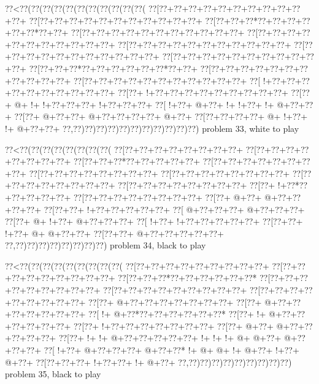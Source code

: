 \vbox{\vbox{\goo
\0??<\0??(\0??(\0??(\0??(\0??(\0??(\0??(\0??(\0??(\0??(\0??(
\0??[\0??+\0??+\0??+\0??+\0??+\0??+\0??+\0??+\0??+\0??+\0??+
\0??[\0??+\0??+\0??+\0??+\0??+\0??+\0??+\0??+\0??+\0??+\0??+
\0??[\0??+\0??+\0??*\0??+\0??+\0??+\0??+\0??+\0??*\0??+\0??+
\0??[\0??+\0??+\0??+\0??+\0??+\0??+\0??+\0??+\0??+\0??+\0??+
\0??[\0??+\0??+\0??+\0??+\0??+\0??+\0??+\0??+\0??+\0??+\0??+
\0??[\0??+\0??+\0??+\0??+\0??+\0??+\0??+\0??+\0??+\0??+\0??+
\0??[\0??+\0??+\0??+\0??+\0??+\0??+\0??+\0??+\0??+\0??+\0??+
\0??[\0??+\0??+\0??+\0??+\0??+\0??+\0??+\0??+\0??+\0??+\0??+
\0??[\0??+\0??+\0??*\0??+\0??+\0??+\0??+\0??+\0??*\0??+\0??+
\0??[\0??+\0??+\0??+\0??+\0??+\0??+\0??+\0??+\0??+\0??+\0??+
\0??[\0??+\0??+\0??+\0??+\0??+\0??+\0??+\0??+\0??+\0??+\0??+
\0??[\- !+\0??+\0??+\0??+\0??+\0??+\0??+\0??+\0??+\0??+\0??+
\0??[\0??+\- !+\0??+\0??+\0??+\0??+\0??+\0??+\0??+\0??+\0??+
\0??[\0??+\- @+\- !+\- !+\0??+\0??+\0??+\- !+\0??+\0??+\0??+
\0??[\- !+\0??+\- @+\0??+\- !+\- !+\0??+\- !+\- @+\0??+\0??+
\0??[\0??+\- @+\0??+\0??+\- @+\0??+\0??+\0??+\0??+\- @+\0??+
\0??[\0??+\0??+\0??+\0??+\- @+\- !+\0??+\- !+\- @+\0??+\0??+
\0??,\0??)\0??)\0??)\0??)\0??)\0??)\0??)\0??)\0??)\0??)\0??)
}
\hfil problem 33, white to play\hfil\break
}

\vbox{\vbox{\goo
\0??<\0??(\0??(\0??(\0??(\0??(\0??(\0??(\0??(
\0??[\0??+\0??+\0??+\0??+\0??+\0??+\0??+\0??+
\0??[\0??+\0??+\0??+\0??+\0??+\0??+\0??+\0??+
\0??[\0??+\0??+\0??*\0??+\0??+\0??+\0??+\0??+
\0??[\0??+\0??+\0??+\0??+\0??+\0??+\0??+\0??+
\0??[\0??+\0??+\0??+\0??+\0??+\0??+\0??+\0??+
\0??[\0??+\0??+\0??+\0??+\0??+\0??+\0??+\0??+
\0??[\0??+\0??+\0??+\0??+\0??+\0??+\0??+\0??+
\0??[\0??+\0??+\0??+\0??+\0??+\0??+\0??+\0??+
\0??[\0??+\- !+\0??*\0??+\0??+\0??+\0??+\0??+
\0??[\0??+\0??+\0??+\0??+\0??+\0??+\0??+\0??+
\0??[\0??+\- @+\0??+\- @+\0??+\0??+\0??+\0??+
\0??[\0??+\0??+\- !+\0??+\0??+\0??+\0??+\0??+
\0??[\- @+\0??+\0??+\0??+\- @+\0??+\0??+\0??+
\0??[\0??+\- @+\- !+\0??+\- @+\0??+\0??+\0??+
\0??[\- !+\0??+\- !+\0??+\0??+\0??+\0??+\0??+
\0??[\0??+\0??+\- !+\0??+\- @+\- @+\0??+\0??+
\0??[\0??+\0??+\- @+\0??+\0??+\0??+\0??+\0??+
\0??,\0??)\0??)\0??)\0??)\0??)\0??)\0??)\0??)
}
\hfil problem 34, black to play\hfil\break
}

\vbox{\vbox{\goo
\0??<\0??(\0??(\0??(\0??(\0??(\0??(\0??(\0??(\0??(
\0??[\0??+\0??+\0??+\0??+\0??+\0??+\0??+\0??+\0??+
\0??[\0??+\0??+\0??+\0??+\0??+\0??+\0??+\0??+\0??+
\0??[\0??+\0??+\0??*\0??+\0??+\0??+\0??+\0??+\0??*
\0??[\0??+\0??+\0??+\0??+\0??+\0??+\0??+\0??+\0??+
\0??[\0??+\0??+\0??+\0??+\0??+\0??+\0??+\0??+\0??+
\0??[\0??+\0??+\0??+\0??+\0??+\0??+\0??+\0??+\0??+
\0??[\0??+\- @+\0??+\0??+\0??+\0??+\0??+\0??+\0??+
\0??[\0??+\- @+\0??+\0??+\0??+\0??+\0??+\0??+\0??+
\0??[\- !+\- @+\0??*\0??+\0??+\0??+\0??+\0??+\0??*
\0??[\0??+\- !+\- @+\0??+\0??+\0??+\0??+\0??+\0??+
\0??[\0??+\- !+\0??+\0??+\0??+\0??+\0??+\0??+\0??+
\0??[\0??+\- @+\0??+\- @+\0??+\0??+\0??+\0??+\0??+
\0??[\0??+\- !+\- !+\- @+\0??+\0??+\0??+\0??+\0??+
\- !+\- !+\- !+\- @+\- @+\0??+\- @+\0??+\0??+\0??+
\0??[\- !+\0??+\- @+\0??+\0??+\0??+\- @+\0??+\0??*
\- !+\- @+\- @+\- !+\- @+\0??+\- !+\0??+\- @+\0??+
\0??[\0??+\0??+\0??+\- !+\0??+\0??+\- !+\- @+\0??+
\0??,\0??)\0??)\0??)\0??)\0??)\0??)\0??)\0??)\0??)
}
\hfil problem 35, black to play\hfil\break
}


